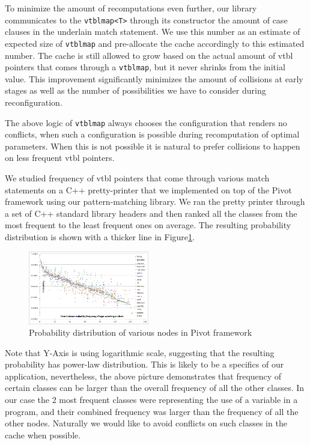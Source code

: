 \documentclass[preprint]{sigplanconf}
\makeatletter
\DeclareRobustCommand{\code}[1]{{\lstinline[breaklines=false,escapechar=@]{#1}}}
\makeatother
\begin{document}
To minimize the amount of recomputations even further, our library communicates 
to the \code{vtblmap<T>} through its constructor the amount of case clauses in 
the underlain match statement. We use this number as an estimate of expected 
size of \code{vtblmap} and pre-allocate the cache accordingly to this estimated 
number. The cache is still allowed to grow based on the actual amount of vtbl 
pointers that comes through a \code{vtblmap}, but it never shrinks from the 
initial value. This improvement significantly minimizes the amount of collisions 
at early stages as well as the number of possibilities we have to consider 
during reconfiguration.

The above logic of \code{vtblmap} always chooses the configuration that renders 
no conflicts, when such a configuration is possible during recomputation of 
optimal parameters. When this is not possible it is natural to prefer collisions 
to happen on less frequent vtbl pointers.

We studied frequency of vtbl pointers that come through various match statements 
on a C++ pretty-printer that we implemented on top of the Pivot 
framework\cite{Pivot09} using our pattern-matching library. We ran the pretty 
printer through a set of C++ standard library headers and then ranked all the 
classes from the most frequent to the least frequent ones on average. The 
resulting probability distribution is shown with a thicker line in 
Figure\ref{fig:PowerLaw}.

\begin{figure}[htbp]
  \centering
    \includegraphics[width=0.47\textwidth]{std-lib-power-law-distributions.png}
  \caption{Probability distribution of various nodes in Pivot framework}
  \label{fig:PowerLaw}
\end{figure}

Note that Y-Axis is using logarithmic scale, suggesting that the resulting 
probability has power-law distribution. This is likely to be a specifics of our 
application, nevertheless, the above picture demonstrates that frequency of certain 
classes can be larger than the overall frequency of all the other classes. In 
our case the 2 most frequent classes were representing the use of a variable in 
a program, and their combined frequency was larger than the frequency of all the 
other nodes. Naturally we would like to avoid conflicts on such classes in the 
cache when possible.
\end{document}
